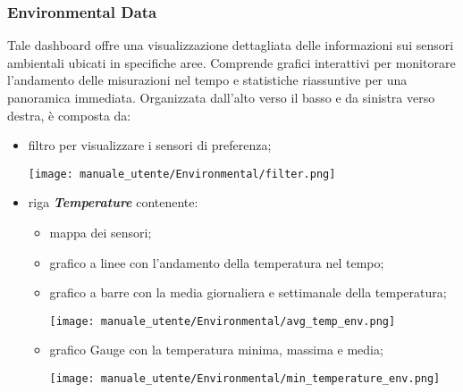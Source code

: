 \subsubsection{Environmental Data}
Tale dashboard offre una visualizzazione dettagliata delle informazioni sui sensori ambientali ubicati in specifiche aree. Comprende grafici interattivi per monitorare l'andamento delle misurazioni nel tempo e statistiche riassuntive per una panoramica immediata. Organizzata dall'alto verso il basso e da sinistra verso destra, è composta da:
\begin{itemize}
    \item filtro per visualizzare i sensori di preferenza;
    \begin{center}
        \texttt{[image: manuale\_utente/Environmental/filter.png]}
    \end{center}
    \item riga \textit{\textbf{Temperature}} contenente:
    \begin{itemize}
        \item mappa dei sensori; %
        \item grafico a linee con l'andamento della temperatura nel tempo; %
        \item grafico a barre con la media giornaliera e settimanale della temperatura;
        \begin{center}
            \texttt{[image: manuale\_utente/Environmental/avg\_temp\_env.png]}
        \end{center}
        \item grafico Gauge con la temperatura minima, massima e media;
        \begin{center}
            \texttt{[image: manuale\_utente/Environmental/min\_temperature\_env.png]}
        \end{center}
    \end{itemize}


\end{itemize}
